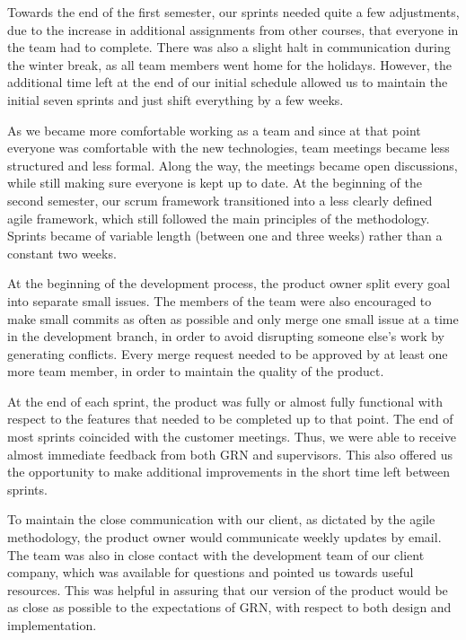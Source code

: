 \documentclass{l3proj}
\begin{document}
Towards the end of the first semester, our sprints needed quite a few
 adjustments, due to the increase in additional assignments from other
 courses, that everyone in the team had to complete. There was also a
 slight halt in communication during the winter break, as all team members
 went home for the holidays. However, the additional time left at the
 end of our initial schedule allowed us to maintain the initial seven
 sprints and just shift everything by a few weeks.

As we became more comfortable working as a team and since at that
 point everyone was comfortable with the new technologies, team
 meetings became less structured and less formal. Along the way,
 the meetings became open discussions, while still making sure
 everyone is kept up to date. At the beginning of the second
 semester, our scrum framework transitioned into a less clearly
 defined agile framework, which still followed the main principles
 of the methodology. Sprints became of variable length (between
 one and three weeks) rather than a constant two weeks.

 

At the beginning of the development process, the product owner split
 every goal into separate small issues. The members of the team were
 also encouraged to make small commits as often as possible and only
 merge one small issue at a time in the development branch, in order
 to avoid disrupting someone else's work by generating conflicts.
 Every merge request needed to be approved by at least one more
 team member, in order to maintain the quality of the product.

At the end of each sprint, the product was fully or almost fully
 functional with respect to the features that needed to be completed
 up to that point. The end of most sprints coincided with the customer
 meetings. Thus, we were able to receive almost immediate feedback
 from both GRN and supervisors. This also offered us the opportunity
 to make additional improvements in the short time left between sprints.

To maintain the close communication with our client, as dictated by
 the agile methodology, the product owner would communicate weekly
 updates by email. The team was also in close contact with the
 development team of our client company, which was available
 for questions and pointed us towards useful resources. This
 was helpful in assuring that our version of the product would
 be as close as possible to the expectations of GRN, with respect
 to both design and implementation.
\end{document}
